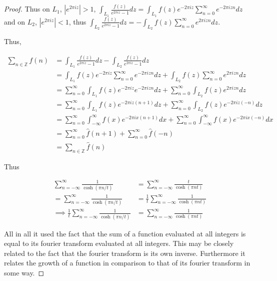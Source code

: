 \documentclass{article}
\newcommand{\Z}{\mathbb{Z}}
\begin{document}
\begin{proof}
    Thus on $L_1$, $|e^{2 \pi i z}| > 1$,  $\int_{L_1} \frac{f(z)}{e^{2 \pi i z} - 1} dz = \int_{L_1} f(z) e^{-2 \pi i z} \sum_{n = 0}^{\infty} e^{-2 \pi i z n} dz$ and on $L_2$, $|e^{2 \pi i z}| < 1$, thus $\int_{L_2} \frac{f(z)}{e^{2 \pi i z} - 1} dz = -\int_{L_2} f(z) \sum_{n = 0}^{\infty} e^{2 \pi i z n} dz$. 

    Thus, 

    \begin{align*}
        \sum_{n \in \Z} f(n) &= \int_{L_1} \frac{f(z)}{e^{2 \pi i z} - 1} dz - \int_{L_2} \frac{f(z)}{e^{2 \pi i z} - 1} dz \\ 
        &= \int_{L_1} f(z) e^{-2 \pi i z} \sum_{n = 0}^{\infty} e^{-2 \pi i z n} dz + \int_{L_2} f(z) \sum_{n = 0}^{\infty} e^{2 \pi i z n} dz \\
        &=\sum_{n = 0}^{\infty}  \int_{L_1} f(z) e^{-2 \pi i z}  e^{-2 \pi i z n} dz + \sum_{n = 0}^{\infty} \int_{L_2} f(z)  e^{2 \pi i z n} dz \\
        &=\sum_{n = 0}^{\infty}  \int_{L_1} f(z) e^{-2 \pi i z(n + 1)}dz + \sum_{n = 0}^{\infty} \int_{L_2} f(z)  e^{-2 \pi i z(-n)} dz \\
        &=\sum_{n = 0}^{\infty}  \int_{-\infty}^\infty f(x) e^{-2 \pi i x(n + 1)}dx + \sum_{n = 0}^{\infty} \int_{-\infty}^\infty f(x)  e^{-2 \pi i x(-n)} dx \\
        &= \sum_{n = 0}^{\infty} \hat{f}(n + 1) + \sum_{n = 0}^{\infty} \hat{f}(-n) \\
        &= \sum_{n \in \Z} \hat{f}(n)
    \end{align*}
    
    Thus 

    \begin{align*}
        \sum_{n = -\infty}^{\infty} \frac{1}{\cosh(\pi n / t)} &= \sum_{n = -\infty}^{\infty} \frac{t}{\cosh(\pi n t)} \\
        = \sum_{n = -\infty}^{\infty} \frac{1}{\cosh(\pi n / t)} &= \frac{1}{t}\sum_{n = -\infty}^{\infty} \frac{1}{\cosh(\pi n t)} \\
        \implies \frac{1}{t} \sum_{n = -\infty}^{\infty} \frac{1}{\cosh(\pi n / t)} &= \sum_{n = -\infty}^{\infty} \frac{1}{\cosh(\pi n t)}
    \end{align*}

    All in all it used the fact that the sum of a function evaluated at all integers is equal to its fourier transform evaluated at all integers. This may be closely related to the fact that the fourier transform is its own inverse. Furthermore it relates the growth of a function in comparison to that of its fourier transform in some way. 
\end{proof}
\end{document}

